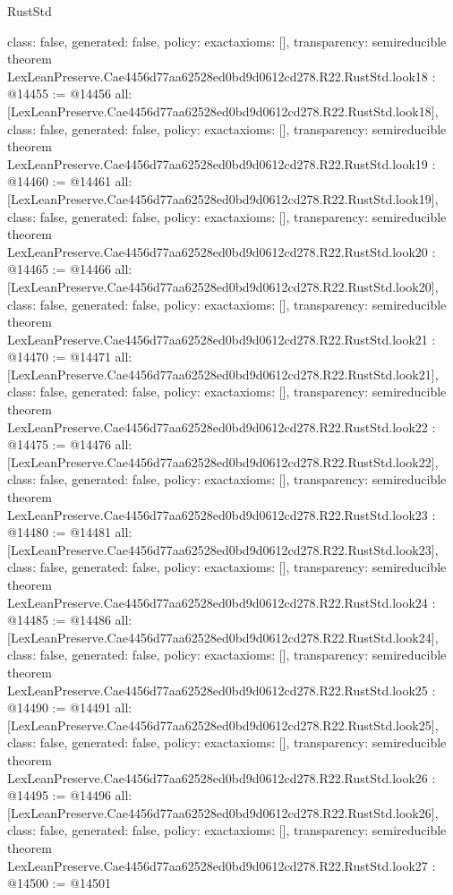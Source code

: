 \begin{lexlean}{RustStd}
\begin{coremodule}
{  class: false,
  generated: false,
  policy: exact{axioms: []},
  transparency: semireducible
}
theorem LexLeanPreserve.Cae4456d77aa62528ed0bd9d0612cd278.R22.RustStd.look18 : @14455 := @14456 {
  all: [LexLeanPreserve.Cae4456d77aa62528ed0bd9d0612cd278.R22.RustStd.look18],
  class: false,
  generated: false,
  policy: exact{axioms: []},
  transparency: semireducible
}
theorem LexLeanPreserve.Cae4456d77aa62528ed0bd9d0612cd278.R22.RustStd.look19 : @14460 := @14461 {
  all: [LexLeanPreserve.Cae4456d77aa62528ed0bd9d0612cd278.R22.RustStd.look19],
  class: false,
  generated: false,
  policy: exact{axioms: []},
  transparency: semireducible
}
theorem LexLeanPreserve.Cae4456d77aa62528ed0bd9d0612cd278.R22.RustStd.look20 : @14465 := @14466 {
  all: [LexLeanPreserve.Cae4456d77aa62528ed0bd9d0612cd278.R22.RustStd.look20],
  class: false,
  generated: false,
  policy: exact{axioms: []},
  transparency: semireducible
}
theorem LexLeanPreserve.Cae4456d77aa62528ed0bd9d0612cd278.R22.RustStd.look21 : @14470 := @14471 {
  all: [LexLeanPreserve.Cae4456d77aa62528ed0bd9d0612cd278.R22.RustStd.look21],
  class: false,
  generated: false,
  policy: exact{axioms: []},
  transparency: semireducible
}
theorem LexLeanPreserve.Cae4456d77aa62528ed0bd9d0612cd278.R22.RustStd.look22 : @14475 := @14476 {
  all: [LexLeanPreserve.Cae4456d77aa62528ed0bd9d0612cd278.R22.RustStd.look22],
  class: false,
  generated: false,
  policy: exact{axioms: []},
  transparency: semireducible
}
theorem LexLeanPreserve.Cae4456d77aa62528ed0bd9d0612cd278.R22.RustStd.look23 : @14480 := @14481 {
  all: [LexLeanPreserve.Cae4456d77aa62528ed0bd9d0612cd278.R22.RustStd.look23],
  class: false,
  generated: false,
  policy: exact{axioms: []},
  transparency: semireducible
}
theorem LexLeanPreserve.Cae4456d77aa62528ed0bd9d0612cd278.R22.RustStd.look24 : @14485 := @14486 {
  all: [LexLeanPreserve.Cae4456d77aa62528ed0bd9d0612cd278.R22.RustStd.look24],
  class: false,
  generated: false,
  policy: exact{axioms: []},
  transparency: semireducible
}
theorem LexLeanPreserve.Cae4456d77aa62528ed0bd9d0612cd278.R22.RustStd.look25 : @14490 := @14491 {
  all: [LexLeanPreserve.Cae4456d77aa62528ed0bd9d0612cd278.R22.RustStd.look25],
  class: false,
  generated: false,
  policy: exact{axioms: []},
  transparency: semireducible
}
theorem LexLeanPreserve.Cae4456d77aa62528ed0bd9d0612cd278.R22.RustStd.look26 : @14495 := @14496 {
  all: [LexLeanPreserve.Cae4456d77aa62528ed0bd9d0612cd278.R22.RustStd.look26],
  class: false,
  generated: false,
  policy: exact{axioms: []},
  transparency: semireducible
}
theorem LexLeanPreserve.Cae4456d77aa62528ed0bd9d0612cd278.R22.RustStd.look27 : @14500 := @14501 {
}
\end{coremodule}
\end{lexlean}
